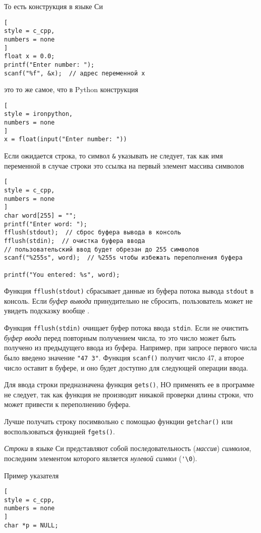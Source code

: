 \documentclass[%
	11pt,
	a4paper,
	utf8,
		]{article}
\begin{document}
То есть конструкция в языке Си
\begin{lstlisting}[
style = c_cpp,
numbers = none
]
float x = 0.0;
printf("Enter number: ");
scanf("%f", &x);  // адрес переменной x
\end{lstlisting}
это то же самое, что в Python конструкция
\begin{lstlisting}[
style = ironpython,
numbers = none
]
x = float(input("Enter number: "))
\end{lstlisting}

Если ожидается строка, то символ \verb*|&| указывать не следует, так как имя переменной в случае строки это ссылка на первый элемент массива символов
\begin{lstlisting}[
style = c_cpp,
numbers = none
]
char word[255] = "";
printf("Enter word: ");
fflush(stdout);  // сброс буфера вывода в консоль
fflush(stdin);  // очистка буфера ввода
// пользовательский ввод будет обрезан до 255 символов
scanf("%255s", word);  // %255s чтобы избежать переполнения буфера

printf("You entered: %s", word);
\end{lstlisting}

Функция \verb|fflush(stdout)| сбрасывает данные из буфера потока вывода \verb*|stdout| в консоль. Если \emph{буфер вывода} принудительно не сбросить, пользователь может не увидеть подсказку вообще \cite[]{prokhorenok-prog-c:2020}.

Функция \verb*|fflush(stdin)| очищает буфер потока ввода \verb|stdin|. Если не очистить \emph{буфер ввода} перед повторным получением числа, то это число может быть получено из предыдущего ввода из буфера. Например, при запросе первого числа было введено значение \verb*|"47 3"|. Функция \verb|scanf()| получит число 47, а второе число оставит в буфере, и оно будет доступно для следующей операции ввода. 

Для ввода строки предназначена функция {\color{red}\verb*|gets()|, НО применять ее в программе не следует}, так как функция не производит никакой проверки длины строки, что может привести к переполнению буфера.

Лучше получать строку посимвольно с помощью функции \verb*|getchar()| или воспользоваться функцией \verb|fgets()|.

\emph{Строки} в языке Си представляют собой последовательность (\emph{массив}) \emph{символов}, последним элементом которого является \emph{нулевой символ} (\verb*|'\0|). 

Пример указателя
\begin{lstlisting}[
style = c_cpp,
numbers = none
]
char *p = NULL;
\end{lstlisting}
\end{document}
